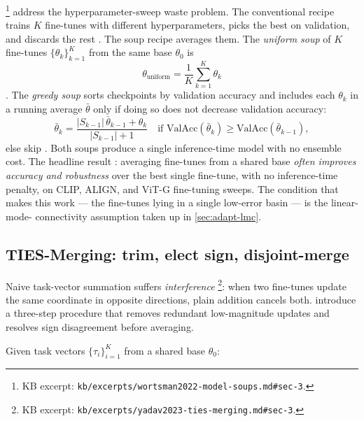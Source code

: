\citet{wortsman2022-model-soups}\footnote{KB excerpt:
\nolinkurl{kb/excerpts/wortsman2022-model-soups.md#sec-3}.} address the
hyperparameter-sweep waste problem. The conventional recipe trains $K$
fine-tunes with different hyperparameters, picks the best on
validation, and discards the rest \citep[\S 1]{wortsman2022-model-soups}.
The soup recipe averages them. The \emph{uniform soup} of $K$ fine-tunes
$\{\theta_k\}_{k=1}^K$ from the same base $\theta_0$ is
\begin{equation}
\theta_{\text{uniform}} = \frac{1}{K}\sum_{k=1}^K \theta_k
\label{eq:soup-uniform}
\end{equation}
\citep[\S 3]{wortsman2022-model-soups}. The \emph{greedy soup} sorts
checkpoints by validation accuracy and includes each $\theta_k$ in a
running average $\bar\theta$ only if doing so does not decrease
validation accuracy:
\begin{equation}
\bar\theta_k = \frac{|S_{k-1}|\, \bar\theta_{k-1} + \theta_k}{|S_{k-1}| + 1}
\quad
\text{if } \mathrm{ValAcc}(\bar\theta_k) \geq \mathrm{ValAcc}(\bar\theta_{k-1}),
\label{eq:soup-greedy}
\end{equation}
else skip \citep[\S 3]{wortsman2022-model-soups}. Both soups produce a
single inference-time model with no ensemble cost. The headline result
\citep[\S 1, \S 4]{wortsman2022-model-soups}: averaging fine-tunes from
a shared base \emph{often improves accuracy and robustness} over the
best single fine-tune, with no inference-time penalty, on CLIP, ALIGN,
and ViT-G fine-tuning sweeps. The condition that makes this work — the
fine-tunes lying in a single low-error basin — is the linear-mode-
connectivity assumption taken up in \cref{sec:adapt-lmc}.

\subsection{TIES-Merging: trim, elect sign, disjoint-merge}
\label{sec:adapt-ties}

Naive task-vector summation suffers \emph{interference}
\citep[abstract]{yadav2023-ties-merging}\footnote{KB excerpt:
\nolinkurl{kb/excerpts/yadav2023-ties-merging.md#sec-3}.}: when two
fine-tunes update the same coordinate in opposite directions, plain
addition cancels both. \citet{yadav2023-ties-merging} introduce a
three-step procedure that removes redundant low-magnitude updates and
resolves sign disagreement before averaging.

Given task vectors $\{\tau_i\}_{i=1}^K$ from a shared base $\theta_0$:

